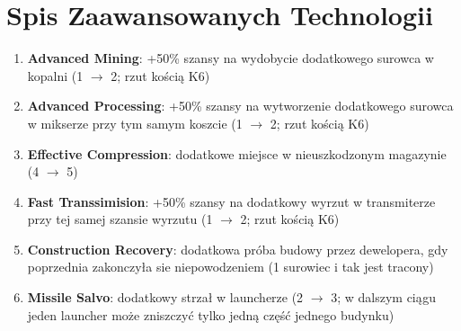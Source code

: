 \documentclass[11pt,a4paper]{article}
\begin{document}
\section{Spis Zaawansowanych Technologii}
\begin{enumerate}
\item \textbf{Advanced Mining}: +50\% szansy na wydobycie dodatkowego surowca w kopalni (1 $\to$ 2; rzut kością K6)
\item \textbf{Advanced Processing}: +50\% szansy na wytworzenie dodatkowego surowca w mikserze przy tym samym koszcie (1 $\to$ 2; rzut kością K6)
\item \textbf{Effective Compression}: dodatkowe miejsce w nieuszkodzonym magazynie (4 $\to$ 5)
\item \textbf{Fast Transsimision}: +50\% szansy na dodatkowy wyrzut w transmiterze przy tej samej szansie wyrzutu (1 $\to$ 2; rzut kością K6)
\item \textbf{Construction Recovery}: dodatkowa próba budowy przez dewelopera, gdy poprzednia zakonczyła sie niepowodzeniem (1 surowiec i tak jest tracony)
\item \textbf{Missile Salvo}: dodatkowy strzał w launcherze (2 $\to$ 3; w dalszym ciągu jeden launcher może zniszczyć tylko jedną część jednego budynku)
\end{enumerate}
\end{document}
